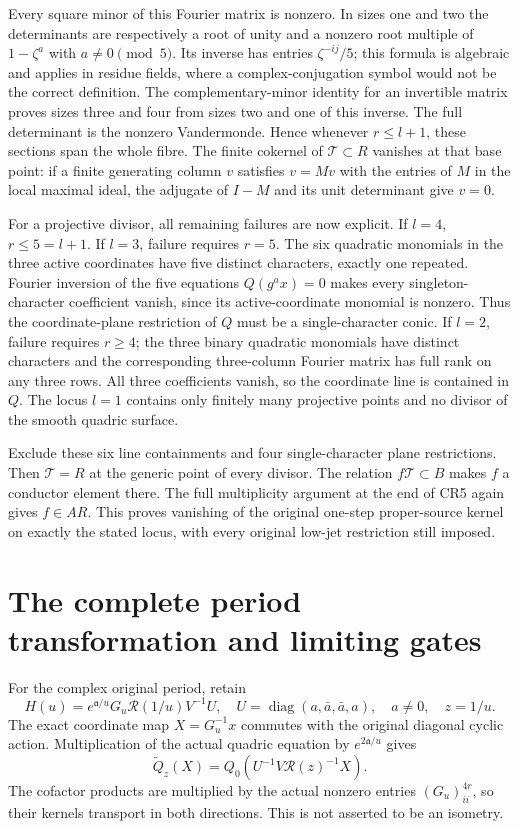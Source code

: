 \documentclass[11pt]{article}
\newcommand{\diag}{\operatorname{diag}}
\begin{document}
Every square minor of this Fourier matrix is nonzero.  In sizes
one and two the determinants are respectively a root of unity
and a nonzero root multiple of $1-\zeta^a$ with $a\ne0\pmod5$.
Its inverse has entries $\zeta^{-ij}/5$; this formula is algebraic
and applies in residue fields, where a complex-conjugation symbol
would not be the correct definition.  The complementary-minor
identity for an invertible matrix proves sizes three and four
from sizes two and one of this inverse.  The full determinant
is the nonzero Vandermonde.  Hence whenever $r\le l+1$, these
sections span the whole fibre.  The finite cokernel of
$\mathcal T\subset R$ vanishes at that base point: if a finite
generating column $v$ satisfies $v=Mv$ with the entries of $M$
in the local maximal ideal, the adjugate of $I-M$ and its unit
determinant give $v=0$.

For a projective divisor, all remaining failures are now explicit.
If $l=4$, $r\le5=l+1$.  If $l=3$, failure requires $r=5$.
The six quadratic monomials in the three active coordinates
have five distinct characters, exactly one repeated.  Fourier
inversion of the five equations $Q(g^a x)=0$ makes every
singleton-character coefficient vanish, since its active-coordinate
monomial is nonzero.  Thus the coordinate-plane restriction of
$Q$ must be a single-character conic.  If $l=2$, failure requires
$r\ge4$; the three binary quadratic monomials have distinct
characters and the corresponding three-column Fourier matrix
has full rank on any three rows.  All three coefficients vanish,
so the coordinate line is contained in $Q$.  The locus $l=1$
contains only finitely many projective points and no divisor of
the smooth quadric surface.

Exclude these six line containments and four single-character
plane restrictions.  Then $\mathcal T=R$ at the generic point
of every divisor.  The relation $f\mathcal T\subset B$ makes
$f$ a conductor element there.  The full multiplicity argument
at the end of CR5 again gives $f\in AR$.  This proves vanishing
of the original one-step proper-source kernel on exactly the
stated locus, with every original low-jet restriction still imposed.

\section{The complete period transformation and limiting gates}
For the complex original period, retain
\[
 H(u)=e^{\mathfrak a/u}G_u\mathcal R(1/u)V^{-1}U,
 \quad U=\diag(a,\bar a,\bar a,a),\quad a\ne0,\quad z=1/u.
                                                                    \tag{CR8}
\]
The exact coordinate map $X=G_u^{-1}x$ commutes with the original
diagonal cyclic action.  Multiplication of the actual quadric
equation by $e^{2\mathfrak a/u}$ gives
\[
 \widetilde Q_z(X)=Q_0(U^{-1}V\mathcal R(z)^{-1}X).              \tag{CR9}
\]
The cofactor products are multiplied by the actual nonzero
entries $(G_u)_{ii}^{4r}$, so their kernels transport in both
directions.  This is not asserted to be an isometry.
\end{document}
